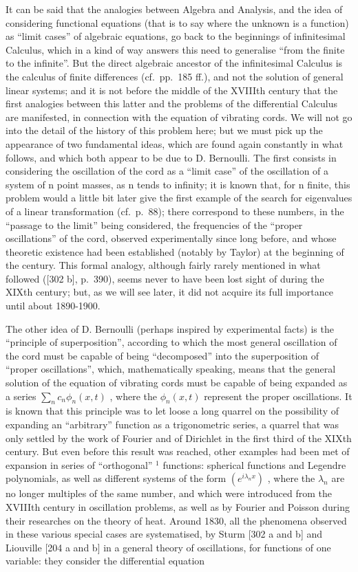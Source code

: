 It can be said that the analogies between Algebra and Analysis, and the idea of considering functional equations (that is to say where the unknown is a function) as ``limit cases'' of algebraic equations, go back to the beginnings of infinitesimal Calculus, which in a kind of way answers this need to generalise ``from the finite to the infinite''. But the direct algebraic ancestor of the infinitesimal Calculus is the calculus of finite differences (cf.~pp.~185 ff.), and not the solution of general linear systems; and it is not before the middle of the XVIIIth century that the first analogies between this latter and the problems of the differential Calculus are manifested, in connection with the equation of vibrating cords. We will not go into the detail of the history of this problem here; but we must pick up the appearance of two fundamental ideas, which are found again constantly in what follows, and which both appear to be due to D. Bernoulli. The first consists in considering the oscillation of the cord as a ``limit case'' of the oscillation of a system of n point masses, as n tends to infinity; it is known that, for n finite, this problem would a little bit later give the first example of the search for eigenvalues of a linear transformation (cf.~p.~88); there correspond to these numbers, in the ``passage to the limit'' being considered, the frequencies of the ``proper oscillations'' of the cord, observed experimentally since long before, and whose theoretic existence had been established (notably by Taylor) at the beginning of the century. This formal analogy, although fairly rarely mentioned in what followed ({[}302 b{]}, p.~390), seems never to have been lost sight of during the XIXth century; but, as we will see later, it did not acquire its full importance until about 1890-1900.

The other idea of D. Bernoulli (perhaps inspired by experimental facts) is the ``principle of superposition'', according to which the most general oscillation of the cord must be capable of being ``decomposed'' into the superposition of ``proper oscillations'', which, mathematically speaking, means that the general solution of the equation of vibrating cords must be capable of being expanded as a series \(\sum_{n} c_{n} \phi_{n}(x, t)\) , where the \(\phi_{n}(x, t)\) represent the proper oscillations. It is known that this principle was to let loose a long quarrel on the possibility of expanding an ``arbitrary'' function as a trigonometric series, a quarrel that was only settled by the work of Fourier and of Dirichlet in the first third of the XIXth century. But even before this result was reached, other examples had been met of expansion in series of ``orthogonal'' \(^{1}\) functions: spherical functions and Legendre polynomials, as well as different systems of the form \((e^{i\lambda_{n}x})\) , where the \(\lambda_{n}\) are no longer multiples of the same number, and which were introduced from the XVIIIth century in oscillation problems, as well as by Fourier and Poisson during their researches on the theory of heat. Around 1830, all the phenomena observed in these various special cases are systematised, by Sturm {[}302 a and b{]} and Liouville {[}204 a and b{]} in a general theory of oscillations, for functions of one variable: they consider the differential equation


